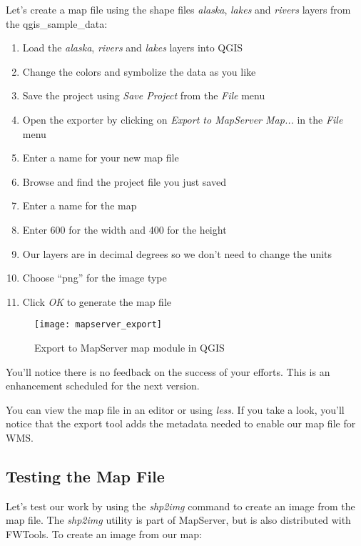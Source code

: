 Let's create a map file using the shape files \textsl{alaska}, \textsl{lakes} 
and \textsl{rivers} layers from the qgis\_sample\_data:

\begin{enumerate}
  \item Load the \textsl{alaska}, \textsl{rivers} and \textsl{lakes} 
  layers into QGIS
  \item Change the colors and symbolize the data as you like
  \item Save the project using \textsl{Save Project} from the
    \textsl{File} menu
  \item Open the exporter by clicking on \textsl{Export to MapServer
    Map...} in the \textsl{File} menu
  \item Enter a name for your new map file
  \item Browse and find the project file you just saved
  \item Enter a name for the map
  \item Enter 600 for the width and 400 for the height
  \item Our layers are in decimal degrees so we don't need to change the
    units
  \item Choose ``png'' for the image type
  \item Click \textsl{OK} to generate the map file
\end{enumerate}


\begin{figure}[ht]
\begin{center}
  \caption{Export to MapServer map module in QGIS}\label{fig:mapserver_export}\smallskip
  \texttt{[image: mapserver\_export]}
\end{center}
\end{figure}

You'll notice there is no feedback on the success of your efforts. This
is an enhancement scheduled for the next version. 

You can view the map file in an editor or using \textsl{less}. If you
take a look, you'll notice that the export tool adds the metadata needed
to enable our map file for WMS. 

\subsection{Testing the Map File}

Let's test our work by using the \textsl{shp2img} command to create an image
from the map file. The  \textsl{shp2img} utility is part of MapServer,
but is also distributed with FWTools. To create an image from our map:

